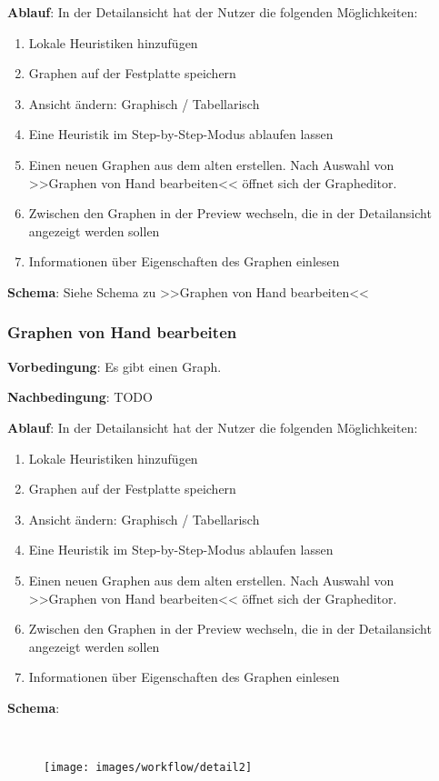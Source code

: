 \documentclass{article}
\begin{document}
	\textbf{Ablauf}:
	In der Detailansicht hat der Nutzer die folgenden Möglichkeiten:
	\begin{enumerate}[1)]
		\item{Lokale Heuristiken hinzufügen}
		\item{Graphen auf der Festplatte speichern}
		\item{Ansicht ändern: Graphisch / Tabellarisch}
		\item{Eine Heuristik im Step-by-Step-Modus ablaufen lassen}
		\item{Einen neuen Graphen aus dem alten erstellen. Nach Auswahl von >>Graphen von Hand bearbeiten<< öffnet sich der Grapheditor.}
		\item{Zwischen den Graphen in der Preview wechseln, die in der Detailansicht angezeigt werden sollen}
		\item{Informationen über Eigenschaften des Graphen einlesen}
	\end{enumerate}
	
	\textbf{Schema}: Siehe Schema zu >>Graphen von Hand bearbeiten<<
	
	
	\subsubsection{Graphen von Hand bearbeiten}
	\textbf{Vorbedingung}: Es gibt einen Graph.
	
	\textbf{Nachbedingung}: TODO
	
	\textbf{Ablauf}:
	In der Detailansicht hat der Nutzer die folgenden Möglichkeiten:
	\begin{enumerate}[1)]
		\item{Lokale Heuristiken hinzufügen}
		\item{Graphen auf der Festplatte speichern}
		\item{Ansicht ändern: Graphisch / Tabellarisch}
		\item{Eine Heuristik im Step-by-Step-Modus ablaufen lassen}
		\item{Einen neuen Graphen aus dem alten erstellen. Nach Auswahl von >>Graphen von Hand bearbeiten<< öffnet sich der Grapheditor.}
		\item{Zwischen den Graphen in der Preview wechseln, die in der Detailansicht angezeigt werden sollen}
		\item{Informationen über Eigenschaften des Graphen einlesen}
	\end{enumerate}
	
	\textbf{Schema}:
	
	~\begin{figure}[!h]
		\centering
		\texttt{[image: images/workflow/detail2]}
	\end{figure}
	
\end{document}
